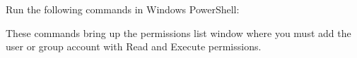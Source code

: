 \documentclass[letterpaper,10pt,english]{sphinxmanual}
\begin{document}
Run the following commands in Windows PowerShell:
\begin{quote}
\begin{description}
\item[{}] \leavevmode
{}
\begin{description}
\item[{}] \leavevmode
{}

\end{description}

\end{description}
\end{quote}

These commands bring up the permissions list window where you must add the user or group account with Read and Execute permissions.
\end{document}
